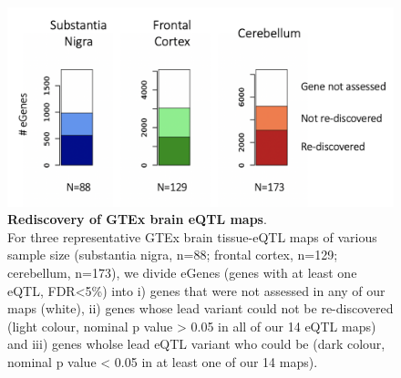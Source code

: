 \begin{figure}[h]
\centering
\includegraphics[width=16cm]{Chapter5/Fig/neuroseq_rediscovering_gtex_brain.png}
\caption[Rediscovery of GTEx brain eQTL maps]{\textbf{Rediscovery of GTEx brain eQTL maps}.\\
For three representative GTEx brain tissue-eQTL maps of various sample size (substantia nigra, n=88; frontal cortex, n=129; cerebellum, n=173), we divide eGenes (genes with at least one eQTL, FDR<5\%) into i) genes that were not assessed in any of our maps (white), ii) genes whose lead variant could not be re-discovered (light colour, nominal p value > 0.05 in all of our 14 eQTL maps) and iii) genes wholse lead eQTL variant who could be (dark colour, nominal p value < 0.05 in at least one of our 14 maps).}
\label{fig:neuroseq_and_gtex_rediscovery}
\end{figure}








